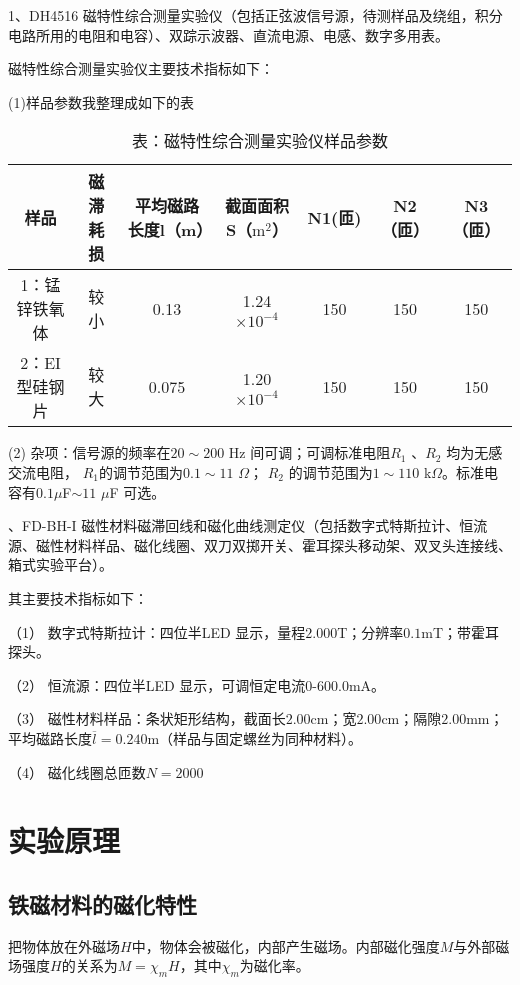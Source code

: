 \documentclass[11pt]{article}
\begin{document}
1、DH4516 磁特性综合测量实验仪（包括正弦波信号源，待测样品及绕组，积分电路所用的电阻和电容）、双踪示波器、直流电源、电感、数字多用表。

磁特性综合测量实验仪主要技术指标如下：

(1)样品参数我整理成如下的表
\begin{table}[!ht]
    \centering
    \begin{tabular}{|c|cccccc|}
    \hline
        样品 & 磁滞耗损 & 平均磁路长度l（m） & 截面面积S（$\mathrm m^2$） & N1(匝) & N2（匝） & N3（匝） \\ \hline
        1：锰锌铁氧体 & 较小 & 0.13 & 1.24$\times 10^{-4}$ & 150& 150 & 150 \\ \hline
        2：EI型硅钢片 & 较大 & 0.075 & 1.20$\times 10^{-4}$ & 150 & 150 & 150 \\ \hline
    \end{tabular}
    \caption*{表：磁特性综合测量实验仪样品参数}
\end{table}

(2) 杂项：信号源的频率在$20\sim 200$ Hz 间可调；可调标准电阻$R_1$ 、$R_2$ 均为无感交流电阻， $R_1$的调节范围为$0.1\sim 11$ $\Omega $； $R_2$ 的调节范围为$1\sim 110$ k$\Omega $。标准电容有$0.1 $$\mu $F$\sim 11$ $\mu $F 可选。

、FD-BH-I 磁性材料磁滞回线和磁化曲线测定仪（包括数字式特斯拉计、恒流源、磁性材料样品、磁化线圈、双刀双掷开关、霍耳探头移动架、双叉头连接线、箱式实验平台）。

其主要技术指标如下：

（1） 数字式特斯拉计：四位半LED 显示，量程$2.000$T；分辨率$0.1$mT；带霍耳探头。

（2） 恒流源：四位半LED 显示，可调恒定电流$0$-$600.0$mA。

（3） 磁性材料样品：条状矩形结构，截面长$2.00$cm；宽$2.00$cm；隔隙$2.00$mm；平均磁路长度$\overline{l} =0.240$m（样品与固定螺丝为同种材料）。

（4） 磁化线圈总匝数$N=2000$

\section{实验原理}


\subsection{铁磁材料的磁化特性}

把物体放在外磁场$H$中，物体会被磁化，内部产生磁场。内部磁化强度$M$与外部磁场强度$H$的关系为$M = \chi_mH$，其中$\chi_m$为磁化率。
\end{document}
